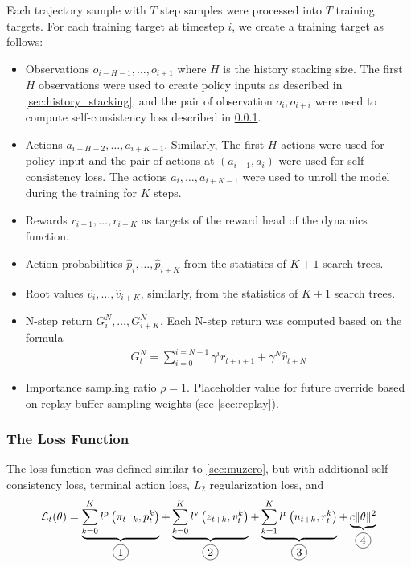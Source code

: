 \documentclass[12pt]{article}
\newcommand*\circled[1]{\tikz[baseline=(char.base)]{
            \node[shape=circle,draw,inner sep=2pt] (char) {#1};}}
\begin{document}
Each trajectory sample with $T$ step samples were processed into $T$ training targets.
For each training target at timestep $i$, we create a training target as follows:
\begin{itemize}
    \item Observations $o_{i - H - 1}, \dots, o_{i + 1}$ where $H$ is the history stacking size.
          The first $H$ observations were used to create policy inputs as described in \ref{sec:history_stacking},
          and the pair of observation $o_{i}, o_{i+i}$ were used to compute self-consistency loss described in \ref{sec:loss}.

    \item Actions $a_{i - H - 2}, \dots, a_{i + K - 1}$.
          Similarly, The first $H$ actions were used for policy input and the pair of actions at $(a_{i - 1}, a_{i})$ were used for self-consistency loss.
          The actions $a_{i}, \dots, a_{i + K - 1}$ were used to unroll the model during the training for $K$ steps.

    \item Rewards $r_{i + 1}, \dots, r_{i + K}$ as targets of the reward head of the dynamics function.
    
    \item Action probabilities $\hat{p}_{i}, \dots, \hat{p}_{i + K}$ from the statistics of $K + 1$ search trees.
    
    \item Root values $\hat{v}_i, \dots, \hat{v}_{i + K}$, similarly, from the statistics of $K + 1$ search trees.

    \item N-step return $G^N_{i}, \dots, G^N_{i + K}$.
          Each N-step return was computed based on the formula
          \begin{align*}
              G^N_{t} = \sum_{i = 0}^{i = N - 1}{\gamma^i r_{t+i+1}} + \gamma^N\hat{v}_{t + N}
          \end{align*}
          
    \item Importance sampling ratio $\rho = 1$. Placeholder value for future override based on replay buffer sampling weights (see \ref{sec:replay}).
\end{itemize}

\subsubsection{The Loss Function} \label{sec:loss}
The loss function was defined similar to \ref{sec:muzero}, but with additional self-consistency loss, terminal action loss, $L_2$ regularization loss, and 
\begin{equation}
    \mathcal{L}_{t}(\theta)=
    \underbrace{\sum_{k=0}^{K} l^{\mathrm{p}}\left(\pi_{t+k}, p_{t}^{k}\right)}_{\circled{1}}
    +
    \underbrace{\sum_{k=0}^{K} l^{\mathrm{v}}\left(z_{t+k}, v_{t}^{k}\right)}_{\circled{2}}
    +
    \underbrace{\sum_{k=1}^{K} l^{\mathrm{r}}\left(u_{t+k}, r_{t}^{k}\right)}_{\circled{3}}
    +
    \underbrace{c\|\theta\|^{2}}_{\circled{4}}
\end{equation}
\end{document}
